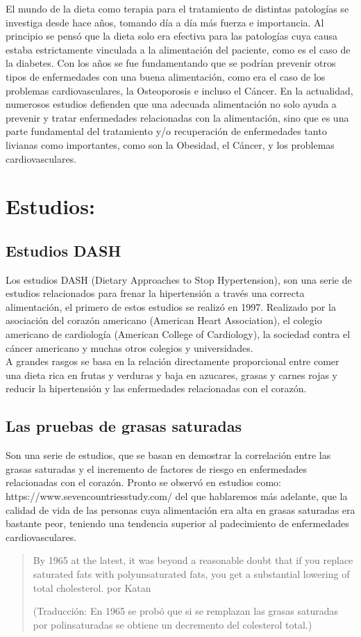 
El mundo de la dieta como terapia para el tratamiento de distintas patologías se investiga desde hace años, tomando día a día más fuerza e importancia. Al principio se pensó que la dieta solo era efectiva para las patologías cuya causa estaba estrictamente vinculada a la alimentación del paciente, como es el caso de la diabetes. Con los años se fue fundamentando que se podrían prevenir otros tipos de enfermedades con una buena alimentación, como era el caso de los problemas cardiovasculares, la Osteoporosis e incluso el Cáncer. En la actualidad, numerosos estudios defienden que una adecuada alimentación no solo ayuda a prevenir y tratar enfermedades relacionadas con la alimentación, sino que es una parte fundamental del tratamiento y/o recuperación de enfermedades tanto livianas como importantes, como son la Obesidad, el Cáncer, y los problemas cardiovasculares.
\section{Estudios:} 
\label{estudios}
\subsection{Estudios DASH \cite{dashStudies}} 
Los estudios DASH (Dietary Approaches to Stop Hypertension), son una serie de estudios relacionados para frenar la hipertensión a través una correcta alimentación, el primero de estos estudios se realizó en 1997. Realizado por la asociación del corazón americano (American Heart Association), el colegio americano de cardiología (American College of Cardiology), la sociedad contra el cáncer americano y muchas otros colegios y universidades.\\

A grandes rasgos se basa en la relación directamente proporcional entre comer una dieta rica en frutas y verduras y baja en azucares, grasas y carnes rojas y reducir la hipertensión y las enfermedades relacionadas con el corazón.\\
\subsection{Las pruebas de grasas saturadas}
Son una serie de estudios, que se basan en demostrar la correlación entre las grasas saturadas y el incremento de factores de riesgo en enfermedades relacionadas con el corazón.
Pronto se observó en estudios como: https://www.sevencountriesstudy.com/ del que hablaremos más adelante, que la calidad de vida de las personas cuya alimentación era alta en grasas saturadas era bastante peor, teniendo una tendencia superior al padecimiento de enfermedades cardiovasculares.\\
\begin{quote}
By 1965 at the latest, it was beyond a reasonable doubt that if you replace saturated fats with polyunsaturated fats, you get a substantial lowering of total cholesterol. por Katan

(Traducción: En 1965 se probó que si se remplazan las grasas saturadas por polinsaturadas se obtiene un decremento del colesterol total.)
\end{quote}

